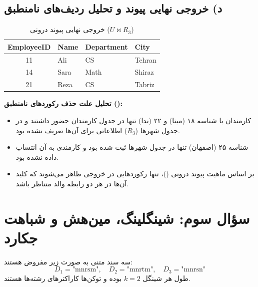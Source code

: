 \documentclass[11pt,a4paper]{article}
\begin{document}
	\subsection{د) خروجی نهایی پیوند و تحلیل ردیف‌های نامنطبق}
	
	\begin{table}[H]
		\centering
		\small
		\renewcommand{\arraystretch}{1.35}
		\caption{خروجی نهایی پیوند درونی ($U \bowtie R_3$)}
		\vspace{0.15cm}
		\begin{latin}
			\begin{tabular}{clll}
				\toprule
				\rowcolor{headerBg}
				\textbf{EmployeeID} & \textbf{Name} & \textbf{Department} & \textbf{City} \\
				\midrule
				11 & Ali & CS & Tehran \\
				14 & Sara & Math & Shiraz \\
				21 & Reza & CS & Tabriz \\
				\bottomrule
			\end{tabular}
		\end{latin}
	\end{table}
	
	\textbf{تحلیل علت حذف رکوردهای نامنطبق ():}
	\begin{itemize}
		\item کارمندان با شناسه ۱۸ (مینا) و ۲۲ (ندا) تنها در جدول کارمندان حضور داشتند و در جدول شهرها ($R_3$) اطلاعاتی برای آن‌ها تعریف نشده بود.
		\item شناسه ۲۵ (اصفهان) تنها در جدول شهرها ثبت شده بود و کارمندی به آن انتساب داده نشده بود.
		\item بر اساس ماهیت پیوند درونی ()، تنها رکوردهایی در خروجی ظاهر می‌شوند که کلید آن‌ها در هر دو رابطه والد متناظر باشد.
	\end{itemize}
	
	\section{سؤال سوم: شینگلینگ، مین‌هش و شباهت جکارد}
	
	سه سند متنی به صورت زیر مفروض هستند:
	\begin{equation}
		D_1 = \text{"mnrsm"}, \quad D_2 = \text{"mnrtm"}, \quad D_3 = \text{"mnrsn"}
	\end{equation}
	طول هر شینگل $k=2$ بوده و توکن‌ها کاراکترهای رشته‌ها هستند.
	
\end{document}
